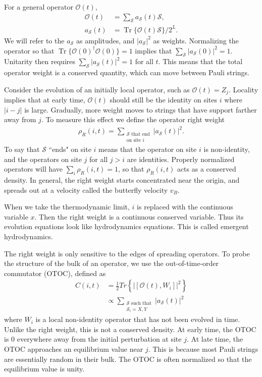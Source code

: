 \documentclass[a4paper,11pt]{article}
\renewcommand{\cal}{\mathcal}
\newcommand{\half}{\frac{1}{2}}
\newcommand{\abs}[1]{\left| #1 \right|}
\renewcommand{\S}{\mathcal{S}}
\newcommand{\nn}{\nonumber\\}
\DeclareMathOperator{\Tr}{Tr}
\begin{document}
For a general operator $\cal{O}(t)$,
\begin{align}
\cal{O}(t) &= \sum_\S a_\S(t) \S,\nn
a_\S(t) &= \Tr\{\cal{O}(t) \S \}/2^L.
\end{align}
We will refer to the $a_\S$ as amplitudes, and $\abs{a_\S}^2$ as weights. Normalizing the operator so that $\Tr\{\cal{O}(0)^\dag\cal{O}(0) \}=1$ implies that $\sum_\S \abs{a_\S(0)}^2=1$. Unitarity then requires $\sum_\S \abs{a_\S(t)}^2=1$ for all $t$. This means that the total operator weight is a conserved quantity, which can move between Pauli strings.

Consider the evolution of an initially local operator, such as $\cal{O}(t)=Z_{j}$. Locality implies that at early time, $\cal{O}(t)$ should still be the identity on sites $i$ where $\abs{i-j}$ is large. Gradually, more weight moves to strings that have support farther away from $j$. To measure this effect we define the operator right weight
\begin{align}
\rho_R(i,t) = \sum_{\substack{\text{$\S$ that end}\\\text{on site $i$}}}\abs{a_\S(t)}^2.
\end{align}
To say that $\S$ ``ends" on site $i$ means that the operator on site $i$ is non-identity, and the operators on site $j$ for all $j>i$ are identities.
Properly normalized operators will have $\sum_i\rho_R(i,t)=1$, so that $\rho_R(i,t)$ acts as a conserved density. In general, the right weight starts concentrated near the origin, and spreads out at a velocity called the butterfly velocity $v_B$. 

When we take the thermodynamic limit, $i$ is replaced with the continuous variable $x$. Then the right weight is a continuous conserved variable. Thus its evolution equations look like hydrodynamics equations. This is called emergent hydrodynamics. 

The right weight is only sensitive to the edges of spreading operators. To probe the structure of the bulk of an operator, we use the out-of-time-order commutator (OTOC), defined as
\begin{align}
C(i,t) &= \half Tr\left\{\abs{[\cal{O}(t), W_i]}^2\right\}\nn
&\propto \sum_{\substack{\text{$\S$ such that}\\\text{$\S_i = X, Y$}}} \abs{a_\S(t)}^2
\end{align}
where $W_i$ is a local non-identity operator that has not been evolved in time. 
Unlike the right weight, this is not a conserved density. At early time, the OTOC is 0 everywhere away from the initial perturbation at site $j$. At late time, the OTOC approaches an equilibrium value near $j$. This is because most Pauli strings are essentially random in their bulk. The OTOC is often normalized so that the equilibrium value is unity. 
\end{document}
